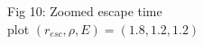 \documentclass[preview]{standalone}
\begin{document}
\begin{center}
Fig 10: Zoomed escape time\\ plot $(r_{esc}, \rho, E)=(1.8, 1.2, 1.2)$
\end{center}
\end{document}
